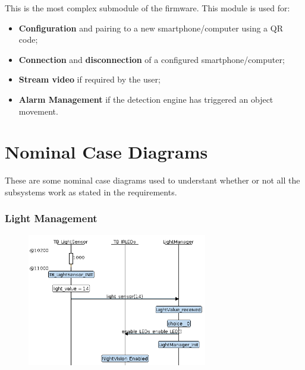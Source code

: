 \documentclass{article}
\begin{document}
This is the most complex submodule of the firmware. This module is used for:
\begin{itemize}
  \item \textbf{Configuration} and pairing to a new smartphone/computer using
    a QR code;
  \item \textbf{Connection} and \textbf{disconnection} of a configured
    smartphone/computer;
  \item \textbf{Stream video} if required by the user;
  \item \textbf{Alarm Management} if the detection engine has triggered an
    object movement.
\end{itemize}

\section{Nominal Case Diagrams}
\label{sec:Nominal Cases Diagram}
These are some nominal case diagrams used to understant whether or not all
the subsystems work as stated in the requirements.

\subsubsection{Light Management}
\label{subs:Light Management}
\begin{figure}[h!]
  \centering
  \includegraphics[width = 0.7\textwidth]{./light_sensor.png}
\end{figure}
\end{document}
